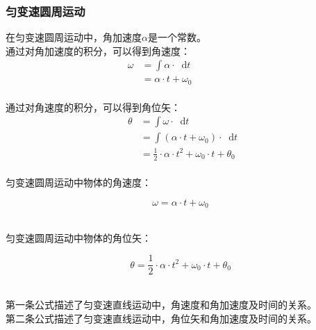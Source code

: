 \documentclass[UTF8]{ctexart}
\newcommand*{\dif}{\mathop{}\!\mathrm{d}}
\begin{document}
\subsubsection{匀变速圆周运动}
    \setcounter{equation}{0}
    在匀变速圆周运动中，角加速度$\alpha$是一个常数。\\[3mm]
    通过对角加速度的积分，可以得到角速度：
    \begin{align}
        \omega
        &=\int \alpha\cdot\dif t~~~~~~~~~~~~~~~~~~~~\\[3mm]
        &=\alpha\cdot t+\omega_0
    \end{align}\\
    通过对角速度的积分，可以得到角位矢：
    \begin{align}
        ~~\theta
        &=\int \omega\cdot\dif t\\[3mm]
        &=\int (\alpha\cdot t+\omega_0)\cdot\dif t\\[3mm]
        &=\frac{1}{2}\cdot \alpha\cdot t^2+\omega_0\cdot t+\theta_0
    \end{align}\\
    匀变速圆周运动中物体的角速度：
    \begin{large}
        \begin{equation*}
            \omega=\alpha\cdot t+\omega_0            
        \end{equation*}
    \end{large}\\
    匀变速圆周运动中物体的角位矢：
    \begin{large}
        \begin{equation*}
            \theta=\frac{1}{2}\cdot \alpha\cdot t^2+\omega_0\cdot t+\theta_0    
        \end{equation*}
    \end{large}\\
    第一条公式描述了匀变速直线运动中，角速度和角加速度及时间的关系。\\[3mm]
    第二条公式描述了匀变速直线运动中，角位矢和角加速度及时间的关系。

\newpage
\end{document}

